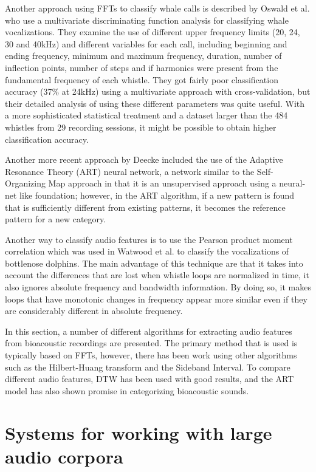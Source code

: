 \documentclass[12pt,oneside]{book}
\begin{document}
Another approach using FFTs to classify whale calls is described by
Oswald et al. \cite{oswald2003acoustic} who use a multivariate
discriminating function analysis for classifying whale vocalizations.
They examine the use of different upper frequency limits (20, 24, 30
and 40kHz) and different variables for each call, including beginning
and ending frequency, minimum and maximum frequency, duration, number
of inflection points, number of steps and if harmonics were present
from the fundamental frequency of each whistle.  They got fairly poor
classification accuracy (37\% at 24kHz) using a multivariate approach
with cross-validation, but their detailed analysis of using these
different parameters was quite useful.  With a more sophisticated
statistical treatment and a dataset larger than the 484 whistles from
29 recording sessions, it might be possible to obtain higher
classification accuracy.

Another more recent approach by Deecke \cite{deecke2006playback} included the
use of the Adaptive Resonance Theory (ART) neural network, a network
similar to the Self-Organizing Map approach in that it is an
unsupervised approach using a neural-net like foundation; however, in
the ART algorithm, if a new pattern is found that is sufficiently
different from existing patterns, it becomes the reference pattern for
a new category.

Another way to classify audio features is to use the Pearson product
moment correlation which was used in Watwood et
al. \cite{watwood2004whistle} to classify the vocalizations of
bottlenose dolphins.  The main advantage of this technique are that it
takes into account the differences that are lost when whistle loops
are normalized in time, it also ignores absolute frequency and
bandwidth information.  By doing so, it makes loops that have
monotonic changes in frequency appear more similar even if they are
considerably different in absolute frequency.

In this section, a number of different algorithms for extracting audio
features from bioacoustic recordings are presented.  The primary
method that is used is typically based on FFTs, however, there has
been work using other algorithms such as the Hilbert-Huang transform
and the Sideband Interval.  To compare different audio features, DTW
has been used with good results, and the ART model has also shown
promise in categorizing bioacoustic sounds.

\section{Systems for working with large audio corpora}
\label{section:relatedWork:systems}
\end{document}
